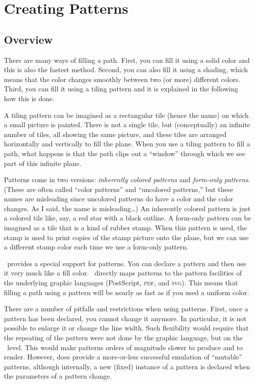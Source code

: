 \section{Creating Patterns}

\label{section-patterns}

\subsection{Overview}

There are many ways of filling a path. First, you can fill it using a
solid color and this is also the fastest method. Second, you can also
fill it using a shading, which means that the color changes smoothly
between two (or more) different colors. Third, you can fill it using a
tiling pattern and it is explained in the following how this is done.

A tiling pattern can be imagined as a rectangular tile (hence the
name) on which a small picture is painted. There is not a single tile,
but (conceptually) an infinite number of tiles, all showing the same
picture, and these tiles are arranged horizontally and vertically to
fill the plane. When you use a tiling pattern to fill a path, what
happens is that the path clips out a ``window'' through which we see
part of this infinite plane.

Patterns come in two versions: \emph{inherently colored patterns} and
\emph{form-only patterns}. (These are often called ``color patterns''
and ``uncolored patterns,'' but these names are misleading since
uncolored patterns do have a color and the color changes. As I said,
the name is misleading\dots) An inherently colored pattern is just a
colored tile like, say, a red star with a black outline. A form-only
pattern can be imagined as a tile that is a kind of rubber stamp. When
this pattern is used, the stamp is used to print copies of the stamp
picture onto the plane, but we can use a different stamp color each
time we use a form-only pattern.

\pgfname\ provides a special support for patterns. You can declare a
pattern and then use it very much like a fill color. \pgfname\
directly maps patterns to the pattern facilities of the underlying
graphic languages (PostScript, \textsc{pdf}, and \textsc{svg}). This
means that filling a path using a pattern will be nearly as fast as if
you used a uniform color.

There are a number of pitfalls and restrictions when using
patterns. First, once a pattern has been declared, you cannot change
it anymore. In particular, it is not possible to enlarge it or change
the line width. Such flexibility would require that the repeating of
the pattern were not done by the graphic language, but on the
\pgfname\ level. This would make patterns orders of magnitude slower
to produce and to render. However, \pgfname{} does provide a
more-or-less successful emulation of ``mutable'' patterns, although
internally, a new (fixed) instance of a pattern is declared when
the parameters of a pattern change.

